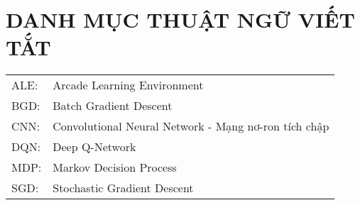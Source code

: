 \chapter*{DANH MỤC THUẬT NGỮ VIẾT TẮT}

\begin{tabular}{ l l }
	ALE: & Arcade Learning Environment\\
	BGD: & Batch Gradient Descent\\
	CNN: & Convolutional Neural Network - Mạng nơ-ron tích chập\\
	DQN: & Deep Q-Network\\
	MDP: & Markov Decision Process\\
	SGD: & Stochastic Gradient Descent	
\end{tabular}